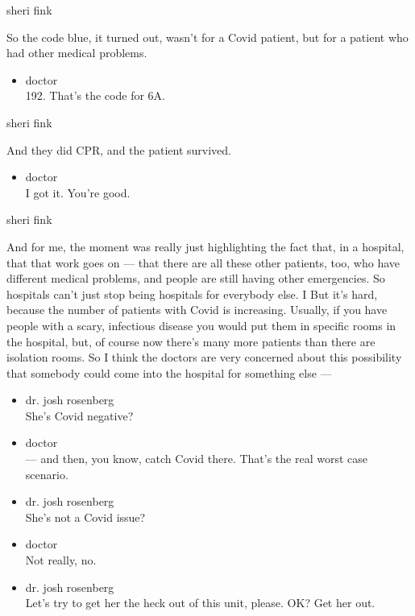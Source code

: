 sheri fink

So the code blue, it turned out, wasn't for a Covid patient, but for a
patient who had other medical problems.

\begin{itemize}
\tightlist
\item
  doctor\\
  192. That's the code for 6A.
\end{itemize}

sheri fink

And they did CPR, and the patient survived.

\begin{itemize}
\tightlist
\item
  doctor\\
  I got it. You're good.
\end{itemize}

sheri fink

And for me, the moment was really just highlighting the fact that, in a
hospital, that that work goes on --- that there are all these other
patients, too, who have different medical problems, and people are still
having other emergencies. So hospitals can't just stop being hospitals
for everybody else. I But it's hard, because the number of patients with
Covid is increasing. Usually, if you have people with a scary,
infectious disease you would put them in specific rooms in the hospital,
but, of course now there's many more patients than there are isolation
rooms. So I think the doctors are very concerned about this possibility
that somebody could come into the hospital for something else ---

\begin{itemize}
\item
  dr. josh rosenberg\\
  She's Covid negative?
\item
  doctor\\
  --- and then, you know, catch Covid there. That's the real worst case
  scenario.
\item
  dr. josh rosenberg\\
  She's not a Covid issue?
\item
  doctor\\
  Not really, no.
\item
  dr. josh rosenberg\\
  Let's try to get her the heck out of this unit, please. OK? Get her
  out.
\end{itemize}

